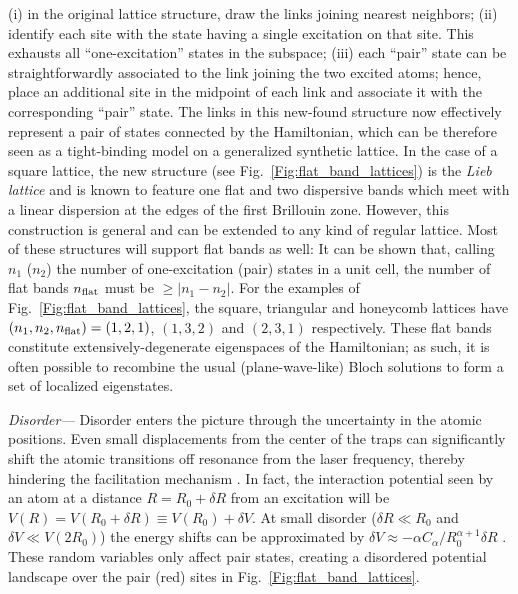 \documentclass[prl,aps,twocolumn,showpacs,superscriptaddress,longbibliography]{revtex4-1}
\newcommand{\abs}[1]{\left| #1 \right|}
\begin{document}
(i) in the original lattice structure, draw the links joining nearest neighbors; (ii) identify each site with the state having a single excitation on that site. This exhausts all ``one-excitation'' states in the subspace; (iii) each ``pair'' state can be straightforwardly associated to the link joining the two excited atoms; hence, place an additional site in the midpoint of each link and associate it with the corresponding ``pair'' state. The links in this new-found structure now effectively represent a pair of states connected by the Hamiltonian, which can be therefore seen as a tight-binding model on a generalized synthetic lattice. In the case of a square lattice, the new structure (see Fig.~\ref{Fig:flat_band_lattices}) is the \emph{Lieb lattice} and is known to feature one flat and two dispersive bands which meet with a linear dispersion at the edges of the first Brillouin zone. However, this construction is general and can be extended to any kind of regular \cite{footnote1} lattice. Most of these structures will support flat bands as well: It can be shown \cite{SM} that, calling $n_1$ ($n_2$) the number of one-excitation (pair) states in a unit cell, the number of flat bands $n_{\rm flat}$ must be $\geq \abs{n_1 - n_2}$. For the examples of Fig.~\ref{Fig:flat_band_lattices}, the square, triangular and honeycomb lattices have $(n_1,n_2,n_{\rm flat}) = (1,2,1)$, $(1,3,2)$ and $(2,3,1)$ respectively. These flat bands constitute extensively-degenerate eigenspaces of the Hamiltonian; as such, it is often possible to recombine the usual (plane-wave-like) Bloch solutions to form a set of localized eigenstates.

\emph{Disorder---} Disorder enters the picture through the uncertainty in the atomic positions. Even small displacements from the center of the traps can significantly shift the atomic transitions off resonance from the laser frequency, thereby hindering the facilitation mechanism \cite{a_Marcuzzi_PRL_17}. In fact, the interaction potential seen by an atom at a distance $R = R_0 + \delta R$ from an excitation will be $V(R) = V(R_0 + \delta R) \equiv V(R_0) + \delta V$. At small disorder ($\delta R \ll R_0$ and $\delta V \ll V(2R_0)$) the energy shifts can be approximated by $\delta V \approx -\alpha C_\alpha / R_0^{\alpha + 1} \delta R$ \cite{SM}. These random variables only affect pair states, creating a disordered potential landscape over the pair (red) sites in Fig.~\ref{Fig:flat_band_lattices}.
\end{document}
